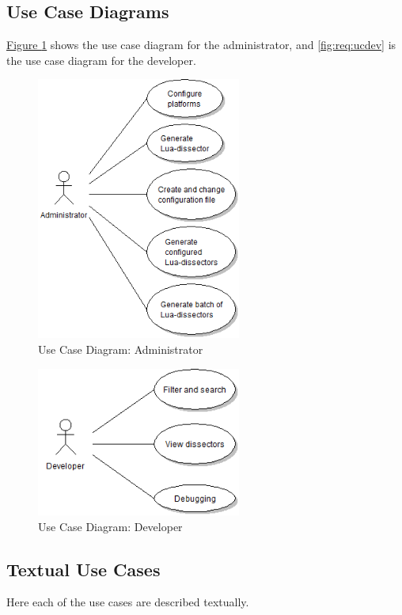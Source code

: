 \subsection{Use Case Diagrams}
\hyperref[fig:req:ucadm]{Figure \ref*{fig:req:ucadm}} shows the use case
diagram for the administrator, and \autoref{fig:req:ucdev} is the use case
diagram for the developer.
\begin{figure}[htbp]
	\center
	\includegraphics[width=0.6\textwidth]{./planning/img/uc_administrator}
	\caption{Use Case Diagram: Administrator\label{fig:req:ucadm}}
\end{figure}

\begin{figure}[htbp]
	\center
	\includegraphics[width=0.6\textwidth]{./planning/img/uc_developer}
	\caption{Use Case Diagram: Developer\label{fig:req:ucdev}}
\end{figure}

\subsection{Textual Use Cases}
Here each of the use cases are described textually.

